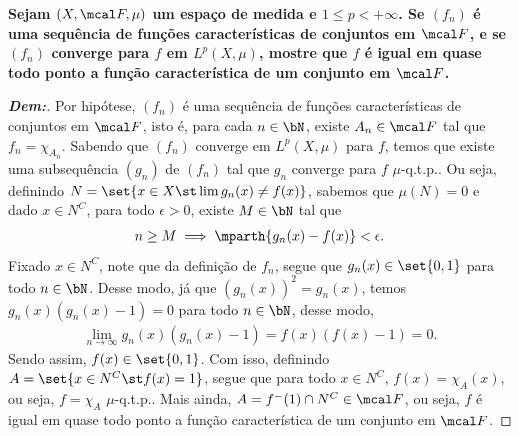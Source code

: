 \textbf{Sejam $(X, \mcal F, \mu)$ um espaço de medida e $1 \le p < +\infty$. 
Se $(f_n)$ é uma sequência de funções características de conjuntos em $\mcal F$, 
e se $(f_n)$ converge para $f$ em $L^p(X, \mu)$, mostre que $f$ é igual em 
quase todo ponto a função característica de um conjunto em $\mcal F$.}
\begin{proof}[\textbf{Dem:}] Por hipótese, $(f_n)$ é uma sequência 
de funções características de conjuntos em $\mcal F$, isto é, 
para cada $n \in \bN$, existe $A_n \in \mcal F$ tal que $f_n = \chi_{A_n}$. 
Sabendo que $(f_n)$ converge em $L^p(X, \mu)$ para $f$, temos que 
existe uma subsequência $(g_n)$ de $(f_n)$ tal que $g_n$ converge para $f$
$\mu$-q.t.p.. Ou seja, definindo $N=\set{x \in X \st \lim g_n(x) \neq f(x)}$,
sabemos que $\mu(N) = 0$ e dado $x \in N^C$, para todo $\epsilon>0$, 
existe $M \in \bN$ tal que 
\begin{align*}
  n \ge M \implies \mparth{g_n(x) - f(x)} < \epsilon.
\end{align*}
Fixado $x \in N^C$, note que da definição de $f_n$, segue que $g_n(x) \in\set{0, 1}$ 
para todo $n \in \bN$. Desse modo, já que $(g_n(x))^2 = g_n(x)$, temos 
$g_n(x)(g_n(x) - 1) = 0$ para todo $n \in \bN$, desse modo,
\begin{align*}
  \lim_{n \rightarrow \infty} g_n(x)(g_n(x) - 1) = f(x)(f(x) - 1) = 0.
\end{align*}
Sendo assim, $f(x) \in \set{0, 1}$. Com isso, definindo $A = \set{x \in N^C \st f(x) = 1}$,
segue que para todo $x \in N^C$, $f(x) = \chi_A(x)$, ou seja, $f = \chi_A$ $\mu$-q.t.p..
Mais ainda, $A = f^-(1)\cap N^C \in \mcal F$, ou seja, $f$ é igual em quase 
todo ponto a função característica de um conjunto em $\mcal F$.
\end{proof}

